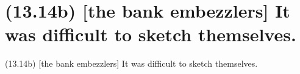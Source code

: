 \documentclass{article}
\begin{document}
\clearpage

%
%

\section*{(13.14b) [the bank embezzlers] It was difficult to sketch themselves.}

\bigbreak
\begin{enumerate*}
\item[(13.14b)] [the bank embezzlers] It was difficult to sketch themselves.
\end{enumerate*}
\bigbreak
\end{document}
